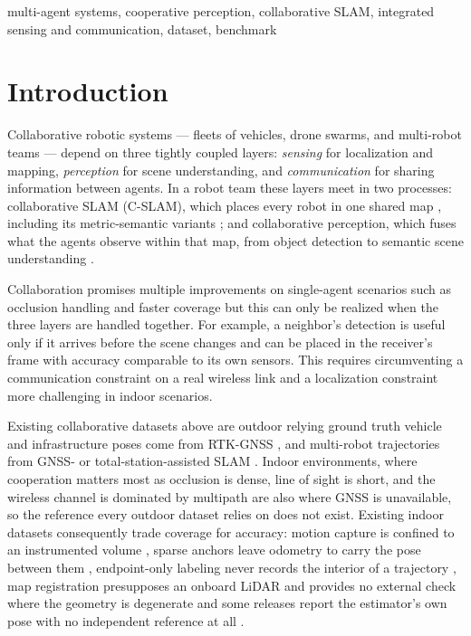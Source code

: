 \documentclass[conference]{IEEEtran}
\begin{document}
\begin{IEEEkeywords}
multi-agent systems, cooperative perception, collaborative SLAM, integrated
sensing and communication, dataset, benchmark
\end{IEEEkeywords}

\section{Introduction}
\label{sec:introduction}
Collaborative robotic systems --- fleets of vehicles, drone swarms, and
multi-robot teams --- depend on three tightly coupled layers: \emph{sensing}
for localization and mapping, \emph{perception} for scene understanding, and
\emph{communication} for sharing information between agents. In a robot team these layers meet in two processes: collaborative
SLAM (C-SLAM), which places every robot in one shared map
\cite{swarmslam,doorslam}, including its metric-semantic variants
\cite{kimeramulti}; and collaborative perception, which fuses what
the agents observe within that map, from object detection to semantic
scene understanding \cite{where2comm}. 

Collaboration promises multiple improvements on single-agent scenarios such as
occlusion handling and faster coverage but this can only be realized when the
three layers are handled together. For example, a neighbor's detection is
useful only if it arrives before the scene changes and can be placed in the
receiver's frame with accuracy comparable to its own sensors. This requires circumventing a communication constraint on a real wireless link and a localization constraint more challenging in indoor scenarios.

Existing collaborative datasets above are outdoor relying ground truth vehicle and infrastructure poses come from RTK-GNSS \cite{dairv2x,deepsense6g,v2v4real},
and multi-robot trajectories from GNSS- or total-station-assisted SLAM
\cite{kimeramulti}. Indoor environments, where cooperation matters most
as occlusion is dense, line of sight is short, and the wireless channel is
dominated by multipath are also where GNSS is
unavailable, so the reference every outdoor dataset relies on does not exist.
Existing indoor datasets consequently trade coverage for accuracy: motion
capture is confined to an instrumented volume \cite{utias,m2dgr}, sparse anchors
leave odometry to carry the pose between them \cite{hilti2022,airmuseum},
endpoint-only labeling never records the interior of a trajectory \cite{s3e},  map registration presupposes an onboard LiDAR and provides no external check where the geometry is degenerate
\cite{subtmrs} and some releases report the estimator's own pose with no independent reference at all \cite{coped}.
\end{document}
